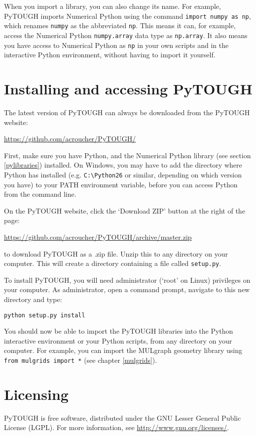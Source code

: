 When you import a library, you can also change its name.  For example, PyTOUGH imports Numerical Python using the command \texttt{import numpy as np}, which renames \texttt{numpy} as the abbreviated \texttt{np}.  This means it can, for example, access the Numerical Python \texttt{numpy.array} data type as \texttt{np.array}.  It also means you have access to Numerical Python as \texttt{np} in your own scripts and in the interactive Python environment, without having to import it yourself.

\section{Installing and accessing PyTOUGH}
\label{installing}

The latest version of PyTOUGH can always be downloaded from the PyTOUGH website:

\url{https://github.com/acroucher/PyTOUGH/}

First, make sure you have Python, and the Numerical Python library (see section \ref{pylibraries}) installed.  On Windows, you may have to add the directory where Python has installed (e.g. \texttt{C:\textbackslash Python26} or similar, depending on which version you have) to your PATH environment variable, before you can access Python from the command line.

On the PyTOUGH website, click the `Download ZIP' button at the right of the page:

\url{https://github.com/acroucher/PyTOUGH/archive/master.zip}

to download PyTOUGH as a .zip file.  Unzip this to any directory on your computer.  This will create a directory containing a file called \texttt{setup.py}.

To install PyTOUGH, you will need administrator (`root' on Linux) privileges on your computer.  As administrator, open a command prompt, navigate to this new directory and type:

\begin{verbatim}
python setup.py install
\end{verbatim}

You should now be able to import the PyTOUGH libraries into the Python interactive environment or your Python scripts, from any directory on your computer.  For example, you can import the MULgraph geometry library using \texttt{from mulgrids import *} (see chapter \ref{mulgrids}).

\section{Licensing}

PyTOUGH is free software, distributed under the GNU Lesser General Public License (LGPL).  For more information, see \url{http://www.gnu.org/licenses/}.
